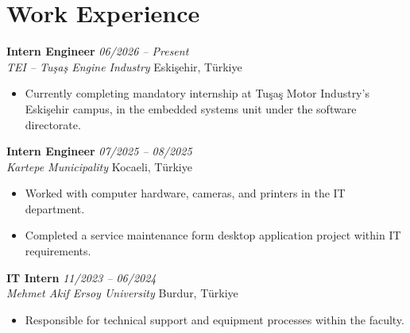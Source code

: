 \section{Work Experience}

\textbf{Intern Engineer} \hfill \textit{06/2026 -- Present} \\
\textit{TEI -- Tuşaş Engine Industry} \hfill Eskişehir, Türkiye
\begin{itemize}[leftmargin=1.5em, itemsep=0pt, topsep=2pt]
  \item Currently completing mandatory internship at Tuşaş Motor Industry's Eskişehir campus, in the embedded systems unit under the software directorate.
\end{itemize}

\vspace{0.4em}

\textbf{Intern Engineer} \hfill \textit{07/2025 -- 08/2025} \\
\textit{Kartepe Municipality} \hfill Kocaeli, Türkiye
\begin{itemize}[leftmargin=1.5em, itemsep=0pt, topsep=2pt]
  \item Worked with computer hardware, cameras, and printers in the IT department.
  \item Completed a service maintenance form desktop application project within IT requirements.
\end{itemize}

\vspace{0.4em}

\textbf{IT Intern} \hfill \textit{11/2023 -- 06/2024} \\
\textit{Mehmet Akif Ersoy University} \hfill Burdur, Türkiye
\begin{itemize}[leftmargin=1.5em, itemsep=0pt, topsep=2pt]
  \item Responsible for technical support and equipment processes within the faculty.
\end{itemize}
